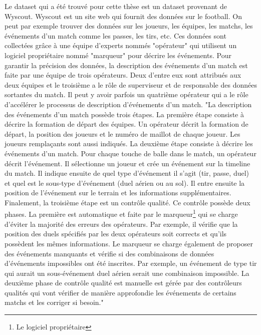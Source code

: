 \documentclass[12pt]{article}
\begin{document}
Le dataset qui a été trouvé pour cette thèse est un dataset provenant de Wyscout. 
Wyscout est un site web qui fournit des données sur le football. 
On peut par exemple trouver des données sur les joueurs, les équipes, les matchs, les événements d'un match comme les passes, les tirs, etc.
Ces données sont collectées grâce à une équipe d'experts nommés "opérateur" qui utilisent un logiciel propriétaire nommé "marqueur" pour décrire les événements.
Pour garantir la précision des données, la description des événements d'un match est faite par une équipe de trois opérateurs. 
Deux d'entre eux sont attribués aux deux équipes et le troisième a le rôle de superviseur et de responsable des données sortantes du match. \cite{pappalardoPublicDataSet2019} 
Il peut y avoir parfois un quatrième opérateur qui a le rôle d'accélérer le processus de description d'événements d'un match. 
\newline\newline
"La description des événements d'un match possède trois étapes.
La première étape consiste à décrire la formation de départ des équipes. 
Un opérateur décrit la formation de départ, la position des joueurs et le numéro de maillot de chaque joueur. Les joueurs remplaçants sont aussi indiqués. 
La deuxième étape consiste à décrire les événements d'un match.
Pour chaque touche de balle dans le match, un opérateur décrit l'événement. 
Il sélectionne un joueur et crée un événement sur la timeline du match.
Il indique ensuite de quel type d'événement il s'agit (tir, passe, duel) et quel est le sous-type d'événement (duel aérien ou au sol).
Il entre ensuite la position de l'événement sur le terrain et les informations supplémentaires.
Finalement, la troisième étape est un contrôle qualité.
Ce contrôle possède deux phases. 
La première est automatique et faite par le marqueur\footnote{Le logiciel propriétaire} qui se charge d'éviter la majorité des erreurs des opérateurs.
Par exemple, il vérifie que la position des duels spécifiés par les deux opérateurs soit corrects et qu'ils possèdent les mêmes informations.
Le marqueur se charge également de proposer des événements manquants et vérifie si des combinaisons de données d'événements impossibles ont été inscrites.
Par exemple, un événement de type tir qui aurait un sous-événement duel aérien serait une combinaison impossible.
La deuxième phase de contrôle qualité est manuelle est gérée par des contrôleurs qualités qui vont vérifier de manière approfondie les événements de certains matchs et les corriger si besoin." \cite{pappalardoPublicDataSet2019}
\end{document}
